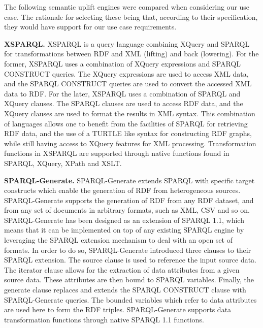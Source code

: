 \documentclass[runningheads]{llncs}
\begin{document}
The following semantic uplift engines were compared when considering our use case. The rationale for selecting these being that, according to their specification, they would have support for our use case requirements. 

\textbf{XSPARQL.} XSPARQL \cite{Bischof2012} is a query language combining XQuery and SPARQL for transformations between RDF and XML (lifting) and back (lowering). For the former, XSPARQL uses a combination of XQuery expressions and SPARQL CONSTRUCT queries. The XQuery expressions are used to access XML data, and the SPARQL CONSTRUCT queries are used to convert the accessed XML data to RDF. For the later, XSPARQL uses a combination of SPARQL and XQuery clauses. The SPARQL clauses are used to access RDF data, and the XQuery clauses are used to format the results in XML syntax. This combination of languages allows one to benefit from the facilities of SPARQL for retrieving RDF data, and the use of a TURTLE like syntax for constructing RDF graphs, while still having access to XQuery features for XML processing. Transformation functions in XSPARQL are supported through native functions found in SPARQL, XQuery, XPath and XSLT.

\textbf{SPARQL-Generate.} SPARQL-Generate \cite{DBLP:conf/esws/LefrancoisZB17} extends SPARQL with specific target constructs which enable the generation of RDF from heterogeneous sources. SPARQL-Generate supports the generation of RDF from any RDF dataset, and from any set of documents in arbitrary formats, such as XML, CSV and so on. SPARQL-Generate has been designed as an extension of SPARQL 1.1, which means that it can be implemented on top of any existing SPARQL engine by leveraging the SPARQL extension mechanism to deal with an open set of formats. In order to do so, SPARQL-Generate introduced three clauses to their SPARQL extension. The source clause is used to reference the input source data. The iterator clause allows for the extraction of data attributes from a given source data. These attributes are then bound to SPARQL variables. Finally, the generate clause replaces and extends the SPARQL CONSTRUCT clause with SPARQL-Generate queries. The bounded variables which refer to data attributes are used here to form the RDF triples. SPARQL-Generate supports data transformation functions through native SPARQL 1.1 functions.
\end{document}
